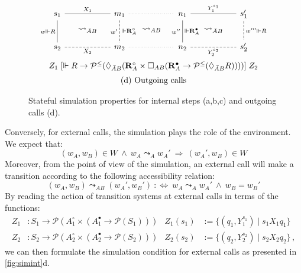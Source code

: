 \documentclass[acmsmall,screen,review,anonymous]{acmart}
\newcommand{\que}{\circ}
\newcommand{\ans}{\bullet}
\begin{document}
\begin{figure}
\[\begin{array}{c}
      \begin{tikzcd}[sep=tiny, column sep=small]
        s_1 \ar[rr, "X_1", dash] \ar[dd, "w \Vdash R"', dash] &&
        m_1 \ar[rr, dotted, dash] \ar[dd, "w'"', "{} \Vdash \mathbf{R}_A^\que", dash, dashed] &&
        n_1 \ar[rr, "Y_1^{s_1}", dash] \ar[dd, "w''"', "{} \Vdash \mathbf{R}_A^\ans", dash] &&
        s_1' \ar[dd, "w''' \Vdash R", dash, dashed]
        \\
        & \leadsto_{\bar{A}B} && \leadsto_{AB} && \leadsto_{\bar{A}B} &
        \\
        s_2 \ar[rr, "X_2"', dash, dashed] &&
        m_2 \ar[rr, dotted, dash] &&
        n_2 \ar[rr, "Y_2^{s_2}"', dash, dashed] &&
        s_2'
      \end{tikzcd}
      \vspace{1ex} \\
      Z_1
      \mathrel{[
        \Vdash R \rightarrow \mathcal{P}^\le(
          \Diamond_{\bar{A}B} (
          \mathbf{R}_A^\que \times
            \Box_{AB} (
            \mathbf{R}_A^\ans \rightarrow
            \mathcal{P}^\le(\Diamond_{\bar{A}B} R))))
      ]}
      Z_2
      \vspace{1.3ex} \\
      \text{(d) Outgoing calls}
    \end{array}
  \]

  \caption{Stateful simulation properties for internal steps (a,b,c)
    and outgoing calls (d).}
  \label{fig:simint}
\end{figure}

Conversely, for external calls,
the simulation plays the role of the environment.
We expect that:
\[
  (w_A, w_B) \in W \:\wedge\:
  w_A \leadsto_A w_A' \:\Rightarrow\:
  (w_A', w_B) \in W
\]
Moreover,
from the point of view of the simulation,
an external call will make a transition according to
the following accessibility relation:
\[
  (w_A, w_B) \leadsto_{AB} (w_A', w_B') \::\Leftrightarrow\:
  w_A \leadsto_A w_A' \:\wedge\:
  w_B = w_B'
\]
By reading the action of transition systems at external calls
in terms of the functions:
\begin{align*}
  Z_1 &: S_1 \rightarrow
    \mathcal{P}(A_1^\que \times (A_1^\ans \rightarrow \mathcal{P}(S_1))) &
  Z_1(s_1) &:= \{ (q_1, Y_1^{s_1}) \mid s_1 \mathrel{X_1} q_1 \}
 \\
  Z_2 &: S_2 \rightarrow
    \mathcal{P}(A_2^\que \times (A_2^\ans \rightarrow \mathcal{P}(S_2))) &
  Z_2(s_2) &:= \{ (q_2, Y_2^{s_2}) \mid s_2 \mathrel{X_2} q_2 \}
  \,,
\end{align*}
we can then formulate the simulation condition for external calls
as presented in \autoref{fig:simint}d.
\end{document}
